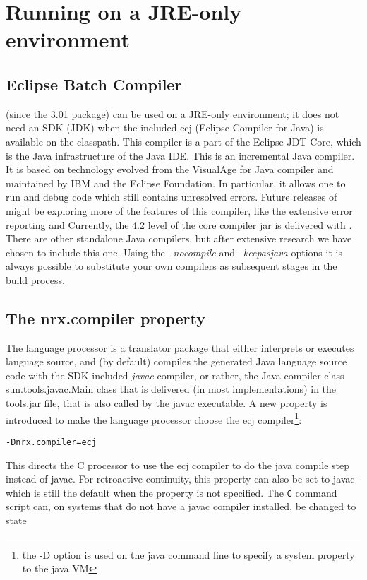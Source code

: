 \chapter{Running on a JRE-only environment\label{nosdk}}
 
\section{Eclipse Batch Compiler}
\nr{} (since the 3.01 package) can be used on a JRE-only environment; it does not need an SDK (JDK) when the included ecj (Eclipse Compiler for Java) is available on the classpath. This compiler is a part of the Eclipse JDT Core, which is the Java infrastructure of the Java IDE. This is an incremental Java compiler. It is based on technology evolved from the VisualAge for Java compiler and maintained by IBM and the Eclipse Foundation. In particular, it allows one to run and debug code which still contains unresolved errors. Future releases of \nr{} might be exploring more of the features of this compiler, like the extensive error reporting and  Currently, the 4.2 level of the core compiler jar is delivered with \nr{}. There are other standalone Java compilers, but after extensive research we have chosen to include this one. Using the \emph{–nocompile} and \emph{–keepasjava} options it is always possible to substitute your own compilers as subsequent stages in the build process.
 
\section{The nrx.compiler property}
The \nr{} language processor is a translator package that either interprets or executes \nr{} language source, and (by default) compiles the generated Java language source code with the SDK-included \emph{javac} compiler, or rather, the Java compiler class sun.tools.javac.Main class that is delivered (in most implementations) in the tools.jar file, that is also called by the javac executable. A new property is introduced to make the language processor choose the ecj compiler\footnote{the -D option is used on the java command line to specify a system property to the java VM}:
 
\begin{verbatim}
-Dnrx.compiler=ecj
\end{verbatim}
 
This directs the \nr{}C processor to use the ecj compiler to do the java compile step instead of javac. For retroactive continuity, this property can also be set to javac - which is still the default when the property is not specified. The \texttt{\nr{}C} command script can, on systems that do not have a javac compiler installed, be changed to state
 
